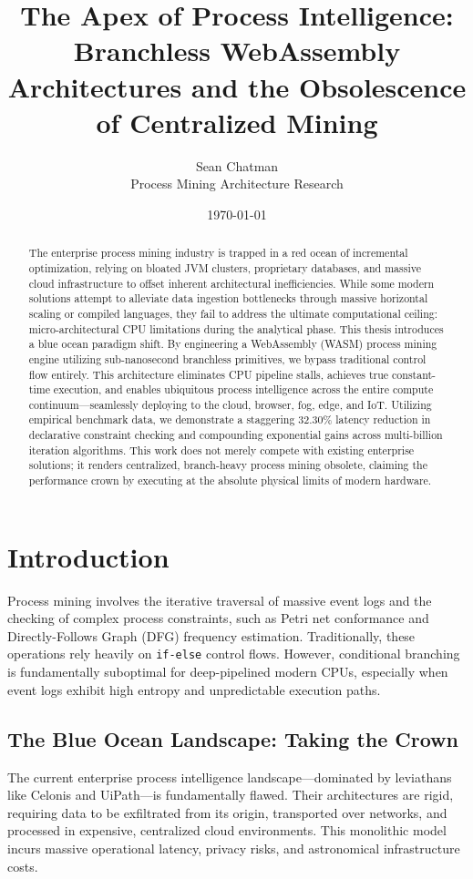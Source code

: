 \documentclass[12pt,a4paper]{report}
\title{\textbf{The Apex of Process Intelligence: Branchless WebAssembly Architectures and the Obsolescence of Centralized Mining}}
\author{Sean Chatman \\ Process Mining Architecture Research}
\date{\today}
\begin{document}
\maketitle

\begin{abstract}
The enterprise process mining industry is trapped in a red ocean of incremental optimization, relying on bloated JVM clusters, proprietary databases, and massive cloud infrastructure to offset inherent architectural inefficiencies. While some modern solutions attempt to alleviate data ingestion bottlenecks through massive horizontal scaling or compiled languages, they fail to address the ultimate computational ceiling: micro-architectural CPU limitations during the analytical phase. This thesis introduces a blue ocean paradigm shift. By engineering a WebAssembly (WASM) process mining engine utilizing sub-nanosecond branchless primitives, we bypass traditional control flow entirely. This architecture eliminates CPU pipeline stalls, achieves true constant-time execution, and enables ubiquitous process intelligence across the entire compute continuum—seamlessly deploying to the cloud, browser, fog, edge, and IoT. Utilizing empirical benchmark data, we demonstrate a staggering 32.30\% latency reduction in declarative constraint checking and compounding exponential gains across multi-billion iteration algorithms. This work does not merely compete with existing enterprise solutions; it renders centralized, branch-heavy process mining obsolete, claiming the performance crown by executing at the absolute physical limits of modern hardware.
\end{abstract}

\chapter{Introduction}
Process mining involves the iterative traversal of massive event logs and the checking of complex process constraints, such as Petri net conformance and Directly-Follows Graph (DFG) frequency estimation. Traditionally, these operations rely heavily on \texttt{if-else} control flows. However, conditional branching is fundamentally suboptimal for deep-pipelined modern CPUs, especially when event logs exhibit high entropy and unpredictable execution paths. 

\section{The Blue Ocean Landscape: Taking the Crown}
The current enterprise process intelligence landscape—dominated by leviathans like Celonis and UiPath—is fundamentally flawed. Their architectures are rigid, requiring data to be exfiltrated from its origin, transported over networks, and processed in expensive, centralized cloud environments. This monolithic model incurs massive operational latency, privacy risks, and astronomical infrastructure costs. 
\end{document}
